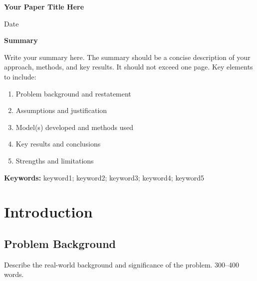 \documentclass[12pt,letterpaper]{article}
\numberwithin{equation}{section}
\numberwithin{figure}{section}
\numberwithin{table}{section}
\begin{document}
\begin{center}
{\Large\bfseries\textlangle Your Paper Title Here\textrangle}

\vspace{0.3cm}
\textlangle Date\textrangle
\end{center}

\vspace{0.5cm}

\noindent\textbf{\large Summary}

\vspace{0.3cm}

\textlangle Write your summary here. The summary should be a concise description of your approach, methods, and key results. It should not exceed one page. Key elements to include:
\begin{enumerate}
    \item Problem background and restatement
    \item Assumptions and justification
    \item Model(s) developed and methods used
    \item Key results and conclusions
    \item Strengths and limitations
\end{enumerate}
\textrangle

\vspace{0.5cm}
\noindent\textbf{Keywords:} keyword1; keyword2; keyword3; keyword4; keyword5

\newpage

\tableofcontents
\newpage

\section{Introduction}

\subsection{Problem Background}
\textlangle Describe the real-world background and significance of the problem. 300--400 words.\textrangle
\end{document}
